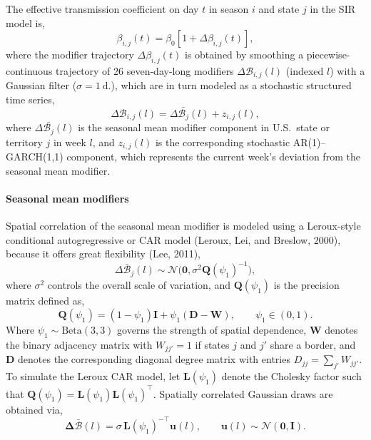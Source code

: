 \documentclass[11pt]{article}
\newcommand{\Normal}{\mathcal{N}}
\begin{document}
The effective transmission coefficient on day $t$ in season $i$ and state $j$ in the SIR model is,
\begin{equation}
\beta_{i,j}(t) = \beta_0 \left[ 1 + \Delta \beta_{i,j}(t) \right],
\end{equation}
where the modifier trajectory $\Delta \beta_{i,j}(t)$ is obtained by smoothing a piecewise-continuous trajectory of 26 seven-day-long modifiers $\Delta \mathcal{B}_{i,j}(l)$ (indexed $l$) with a Gaussian filter ($\sigma = 1~\text{d.}$), which are in turn modeled as a stochastic structured time series,
\begin{equation}
    \Delta \mathcal{B}_{i,j} (l) = \Delta\bar{\mathcal{B}_{j}}(l) + z_{i,j}(l),
\end{equation}
where $\Delta\bar{\mathcal{B}_{j}}(l)$ is the seasonal mean modifier component in U.S.\ state or territory $j$ in week $l$, and $z_{i,j}(l)$ is the corresponding stochastic AR(1)--GARCH(1,1) component, which represents the current week's deviation from the seasonal mean modifier.

\paragraph{Seasonal mean modifiers}
Spatial correlation of the seasonal mean modifier is modeled using a Leroux-style conditional autogregressive or CAR model (Leroux, Lei, and Breslow, 2000), because it offers great flexibility (Lee, 2011),
\begin{equation}
    \Delta \bar{\mathcal{B}}_j(l) \sim \Normal\big(\bm{0}, \sigma^2 \bm{Q}(\psi_1)^{-1}\big),
\end{equation}
where $\sigma^2$ controls the overall scale of variation, and $\bm{Q}(\psi_1)$ is the precision matrix defined as,
\begin{equation}
    \bm{Q}(\psi_1) = (1 - \psi_1)\bm{I} + \psi_1 (\bm{D} - \bm{W}), 
    \qquad \psi_1 \in (0,1).
\end{equation}
Where $\psi_1 \sim \text{Beta}(3,3)$ governs the strength of spatial dependence, $\bm{W}$ denotes the binary adjacency matrix with $W_{jj'} = 1$ if states $j$ and $j'$ share a border, and $\bm{D}$ denotes the corresponding diagonal degree matrix with entries $D_{jj} = \sum_{j'} W_{jj'}$. To simulate the Leroux CAR model, let $\bm{L}(\psi_1)$ denote the Cholesky factor such that $\bm{Q}(\psi_1) = \bm{L}(\psi_1)\bm{L}(\psi_1)^\top$. Spatially correlated Gaussian draws are obtained via,
\begin{equation}
    \bm{\Delta \bar{\mathcal{B}}}(l) = \sigma \, \bm{L}(\psi_1)^{-\top} \bm{u}(l), 
    \qquad \bm{u}(l) \sim \Normal(\bm{0}, \bm{I}).
\end{equation}
\end{document}
